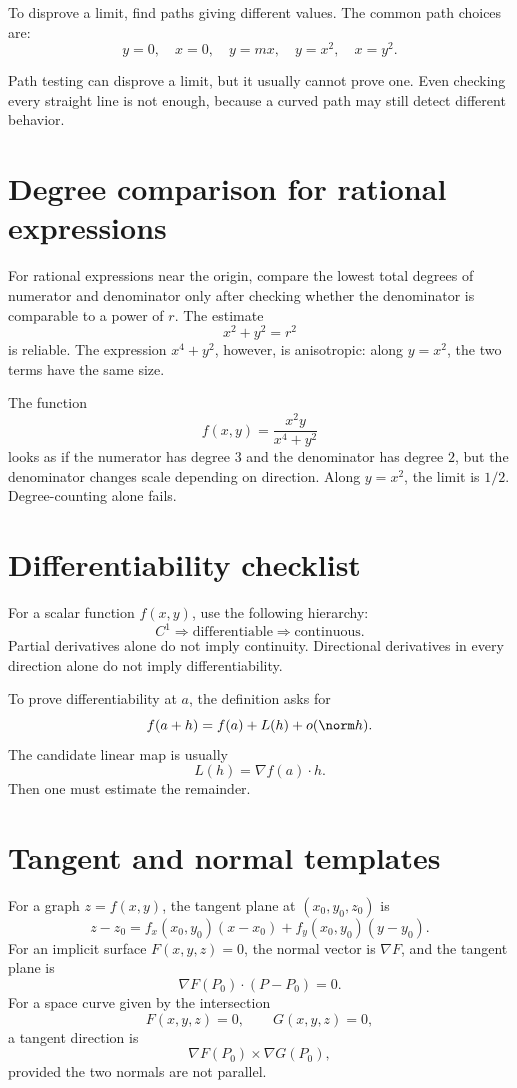 To disprove a limit, find paths giving different values.  The common path choices are:
\[
  y=0,\quad x=0,\quad y=mx,\quad y=x^2,\quad x=y^2.
\]

\begin{caution}
Path testing can disprove a limit, but it usually cannot prove one.  Even checking every straight line is not enough, because a curved path may still detect different behavior.
\end{caution}

\section{Degree comparison for rational expressions}

For rational expressions near the origin, compare the lowest total degrees of numerator and denominator only after checking whether the denominator is comparable to a power of \(r\).  The estimate
\[
  x^2+y^2=r^2
\]
is reliable.  The expression \(x^4+y^2\), however, is anisotropic: along \(y=x^2\), the two terms have the same size.

\begin{example}
The function
\[
  f(x,y)=\frac{x^2y}{x^4+y^2}
\]
looks as if the numerator has degree \(3\) and the denominator has degree \(2\), but the denominator changes scale depending on direction.  Along \(y=x^2\), the limit is \(1/2\).  Degree-counting alone fails.
\end{example}

\section{Differentiability checklist}

For a scalar function \(f(x,y)\), use the following hierarchy:
\[
  C^1\Longrightarrow\text{differentiable}\Longrightarrow\text{continuous}.
\]
Partial derivatives alone do not imply continuity.  Directional derivatives in every direction alone do not imply differentiability.

To prove differentiability at \(a\), the definition asks for
\[
  f(a+h)=f(a)+L(h)+o(\norm h).
\]
The candidate linear map is usually
\[
  L(h)=\nabla f(a)\cdot h.
\]
Then one must estimate the remainder.

\section{Tangent and normal templates}

For a graph \(z=f(x,y)\), the tangent plane at \((x_0,y_0,z_0)\) is
\[
  z-z_0=f_x(x_0,y_0)(x-x_0)+f_y(x_0,y_0)(y-y_0).
\]
For an implicit surface \(F(x,y,z)=0\), the normal vector is \(\nabla F\), and the tangent plane is
\[
  \nabla F(P_0)\cdot(P-P_0)=0.
\]
For a space curve given by the intersection
\[
  F(x,y,z)=0,\qquad G(x,y,z)=0,
\]
a tangent direction is
\[
  \nabla F(P_0)\times\nabla G(P_0),
\]
provided the two normals are not parallel.

